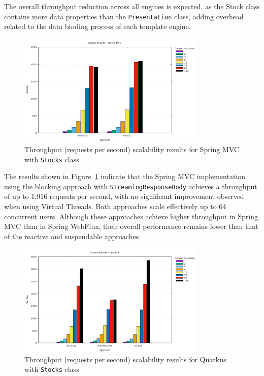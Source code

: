 The overall throughput reduction across all engines is expected, as the Stock
class contains more data properties than the \texttt{Presentation} class,
adding overhead related to the data binding process of each template engine.

\begin{figure}[h]
     \centering
     \includegraphics[width=0.8\textwidth]{./Graphs/stocks-springmvc-jmeter.png}
     \caption{Throughput (requests per second) scalability results for Spring MVC with \texttt{Stocks} class}\label{fig:stocks-springmvc-jmeter}
\end{figure}

The results shown in Figure~\ref{fig:stocks-springmvc-jmeter} indicate that the
Spring MVC implementation using the blocking approach with
\texttt{StreamingResponseBody} achieves a throughput of up to 1,916 requests
per second, with no significant improvement observed when using Virtual
Threads. Both approaches scale effectively up to 64 concurrent users. Although
these approaches achieve higher throughput in Spring MVC than in Spring
WebFlux, their overall performance remains lower than that of the reactive and
suspendable approaches.

\begin{figure}[h]
     \centering
     \includegraphics[width=0.8\textwidth]{./Graphs/stocks-quarkus-jmeter.png}
     \caption{Throughput (requests per second) scalability results for Quarkus with \texttt{Stocks} class}\label{fig:stocks-quarkus-jmeter}
\end{figure}

